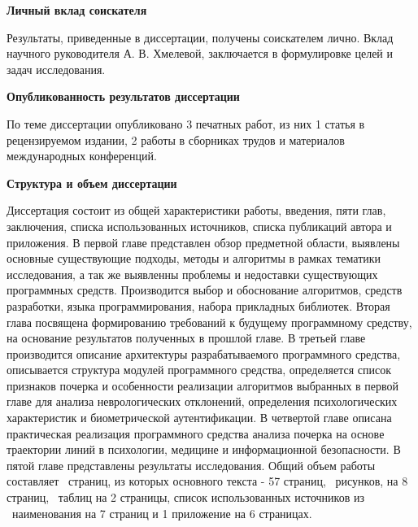 \bigskip
\textbf{Личный вклад соискателя}
\bigskip

Результаты, приведенные в диссертации, получены  соискателем лично. Вклад научного руководителя А. В. Хмелевой, заключается в формулировке целей и задач исследования.

\bigskip
\textbf{Опубликованность результатов диссертации}
\bigskip

По теме диссертации опубликовано 3 печатных работ, из них 1 статья в рецензируемом издании, 2 работы в сборниках трудов и материалов международных конференций.

\bigskip
\textbf{Структура и объем диссертации}
\bigskip

Диссертация состоит из общей характеристики работы, введения, пяти глав, заключения, списка использованных источников, списка публикаций автора и приложения. В первой главе представлен обзор предметной области, выявлены основные существующие подходы, методы и алгоритмы в рамках тематики исследования, а так же выявленны проблемы и недоставки существующих программных средств. Производится выбор и обоснование алгоритмов, средств разработки, языка программирования, набора прикладных библиотек. Вторая глава посвящена формированию требований к будущему программному средству, на основание результатов полученных в прошлой главе. В третьей главе производится описание архитектуры разрабатываемого программного средства, описывается структура модулей программного средства, определяется список признаков почерка и особенности реализации алгоритмов выбранных в первой главе для анализа неврологических отклонений, определения психологических характеристик и биометрической аутентификации. В четвертой главе описана практическая реализация программного средства анализа почерка на основе траектории линий в психологии, медицине и информационной безопасности. В пятой главе представлены результаты исследования.
Общий объем работы составляет \totpages~страниц, из которых основного текста - 57 страниц, \totfig{}~рисунков, на 8 страниц, \tottab{}~таблиц на 2 страницы, список использованных источников из \totref{}~наименования на 7 страниц и 1 приложение на 6 страницах.